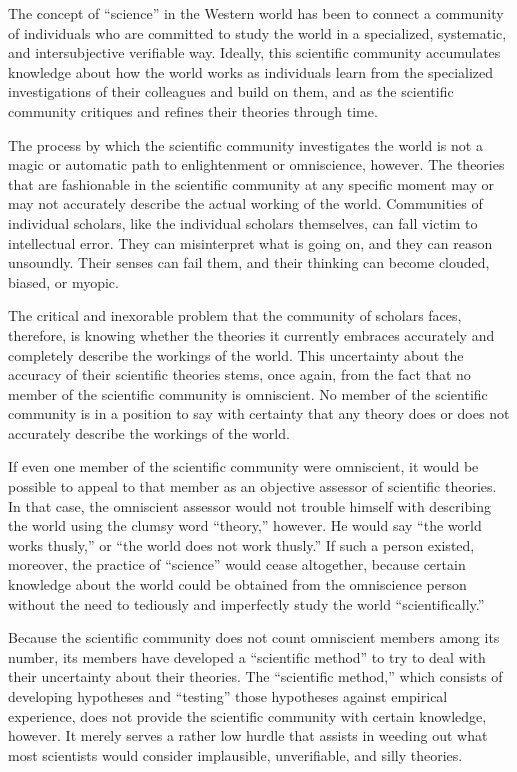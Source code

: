 The concept of ``science'' in the Western world has been to connect a community of individuals who are committed to study the world in a specialized, systematic, and intersubjective verifiable way. Ideally, this scientific community accumulates knowledge about how the world works as individuals learn from the specialized investigations of their colleagues and build on them, and as the scientific community critiques and refines their theories through time.

The process by which the scientific community investigates the world is not a magic or automatic path to enlightenment or omniscience, however. The theories that are fashionable in the scientific community at any specific moment may or may not accurately describe the actual working of the world. Communities of individual scholars, like the individual scholars themselves, can fall victim to intellectual error. They can misinterpret what is going on, and they can reason unsoundly. Their senses can fail them, and their thinking can become clouded, biased, or myopic.

The critical and inexorable problem that the community of scholars faces, therefore, is knowing whether the theories it currently embraces accurately and completely describe the workings of the world. This uncertainty about the accuracy of their scientific theories stems, once again, from the fact that no member of the scientific community is omniscient. No member of the scientific community is in a position to say with certainty that any theory does or does not accurately describe the workings of the world.

If even one member of the scientific community were omniscient, it would be possible to appeal to that member as an objective assessor of scientific theories. In that case, the omniscient assessor would not trouble himself with describing the world using the clumsy word ``theory,'' however. He would say ``the world works thusly,'' or ``the world does not work thusly.'' If such a person existed, moreover, the practice of ``science'' would cease altogether, because certain knowledge about the world could be obtained from the omniscience person without the need to tediously and imperfectly study the world ``scientifically.''

Because the scientific community does not count omniscient members among its number, its members have developed a ``scientific method'' to try to deal with their uncertainty about their theories. The ``scientific method,'' which consists of developing hypotheses and ``testing'' those hypotheses against empirical experience, does not provide the scientific community with certain knowledge, however. It merely serves a rather low hurdle that assists in weeding out what most scientists would consider implausible, unverifiable, and silly theories.

